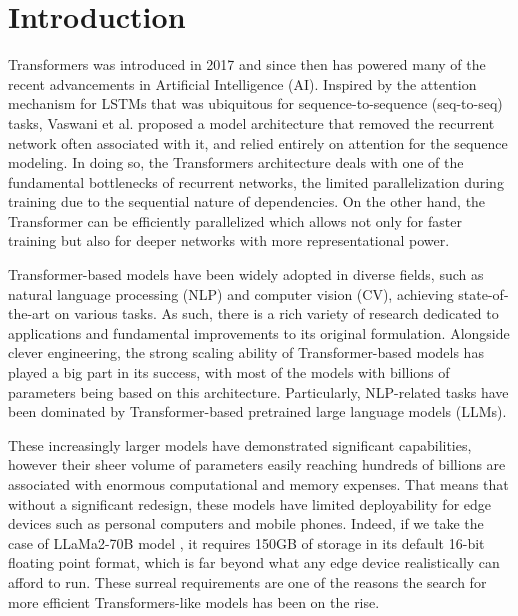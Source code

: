 \section{Introduction}

Transformers \cite{vaswani2023attention} was introduced in 2017 and since then has powered many of the recent advancements in Artificial Intelligence (AI). Inspired by the attention mechanism for LSTMs \cite{10.1162/neco.1997.9.8.1735}\cite{bahdanau2016neural}\cite{luong2015effective}\cite{kim2017structured} that was ubiquitous for sequence-to-sequence (seq-to-seq) tasks,  Vaswani et al. proposed a model architecture that removed the recurrent network often associated with it, and relied entirely on attention for the sequence modeling. In doing so, the Transformers architecture deals with one of the fundamental bottlenecks of recurrent networks, the limited parallelization during training due to the sequential nature of dependencies. On the other hand, the Transformer can be efficiently parallelized which allows not only for faster training but also for deeper networks with more representational power.


Transformer-based models have been widely adopted in diverse fields,
such as natural language processing (NLP) and computer vision (CV), achieving state-of-the-art on various tasks. As such, there is a rich variety of research dedicated to applications and fundamental improvements to its original formulation. Alongside clever engineering, the strong scaling ability of Transformer-based models has played a big part in its success, with most of the models with billions of parameters being based on this architecture. Particularly, NLP-related tasks have been dominated by Transformer-based pretrained large language models (LLMs).

These increasingly larger models have demonstrated significant capabilities, however their sheer volume of parameters easily reaching hundreds of billions are associated with enormous computational and memory expenses. That means that without a significant redesign, these models have limited deployability for edge devices such as personal computers and mobile phones. Indeed, if we take the case of LLaMa2-70B model \cite{touvron2023llama}, it requires 150GB of storage in its default 16-bit floating point format, which is far beyond what any edge device realistically can afford to run. These surreal requirements are one of the reasons the search for more efficient Transformers-like models has been on the rise.

